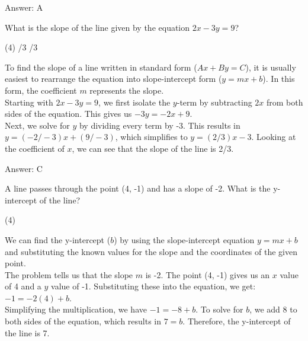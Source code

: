 \documentclass[11pt,paper=a4,answers]{exam}
\begin{document}
\begin{questions}
\begin{solution}
\vspace{15pt}
Answer: \colorbox{yellow!100}{A}
\end{solution}

\question
What is the slope of the line given by the equation $2x - 3y = 9$?
\begin{tasks}(4)
    /3
    /3
\end{tasks}

\begin{solution}
To find the slope of a line written in standard form ($Ax + By = C$), it is usually easiest to rearrange the equation into slope-intercept form ($y = mx + b$). In this form, the coefficient $m$ represents the slope.
\\[10pt]
Starting with $2x - 3y = 9$, we first isolate the $y$-term by subtracting $2x$ from both sides of the equation. This gives us $-3y = -2x + 9$.
\\[10pt]
Next, we solve for $y$ by dividing every term by -3. This results in $y = (-2/-3)x + (9/-3)$, which simplifies to $y = (2/3)x - 3$. Looking at the coefficient of $x$, we can see that the slope of the line is 2/3.

\vspace{15pt}
Answer: \colorbox{yellow!100}{C}
\end{solution}

\question
A line passes through the point (4, -1) and has a slope of -2. What is the y-intercept of the line?
\begin{tasks}(4)
\end{tasks}

\begin{solution}
We can find the y-intercept ($b$) by using the slope-intercept equation $y = mx + b$ and substituting the known values for the slope and the coordinates of the given point.
\\[10pt]
The problem tells us that the slope $m$ is -2. The point (4, -1) gives us an $x$ value of 4 and a $y$ value of -1. Substituting these into the equation, we get: $-1 = -2(4) + b$.
\\[10pt]
Simplifying the multiplication, we have $-1 = -8 + b$. To solve for $b$, we add 8 to both sides of the equation, which results in $7 = b$. Therefore, the y-intercept of the line is 7.


\end{solution}
\end{questions}
\end{document}
